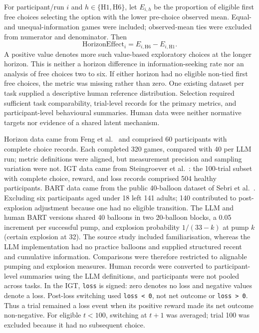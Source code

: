\documentclass[logo,msc]{infthesis}
\begin{document}
For participant/run $i$ and $h\in\{\mathrm{H1},\mathrm{H6}\}$, let $E_{i,h}$ be the proportion of eligible first free choices selecting the option with the lower pre-choice observed mean. Equal- and unequal-information games were included; observed-mean ties were excluded from numerator and denominator. Then
\[
\mathrm{HorizonEffect}_{i}=E_{i,\mathrm{H6}}-E_{i,\mathrm{H1}}.
\]
A positive value denotes more such value-based exploratory choices at the longer horizon. This is neither a horizon difference in information-seeking rate nor an analysis of free choices two to six. If either horizon had no eligible non-tied first free choices, the metric was missing rather than zero.
One existing dataset per task supplied a descriptive human reference distribution. Selection required sufficient task comparability, trial-level records for the primary metrics, and participant-level behavioural summaries. Human data were neither normative targets nor evidence of a shared latent mechanism.

Horizon data came from Feng et al.~\cite{Feng2021ExploreExploit} and comprised 60 participants with complete choice records. Each completed 320 games, compared with 40 per LLM run; metric definitions were aligned, but measurement precision and sampling variation were not. IGT data came from Steingroever et al.~\cite{Steingroever2015IGTData}: the 100-trial subset with complete choice, reward, and loss records comprised 504 healthy participants. BART data came from the public 40-balloon dataset of Sebri et al.~\cite{Sebri2023BART}. Excluding six participants aged under 18 left 141 adults; 140 contributed to post-explosion adjustment because one had no eligible transition. The LLM and human BART versions shared 40 balloons in two 20-balloon blocks, a 0.05 increment per successful pump, and explosion probability $1/(33-k)$ at pump $k$ (certain explosion at 32). The source study included familiarisation, whereas the LLM implementation had no practice balloons and supplied structured recent and cumulative information. Comparisons were therefore restricted to alignable pumping and explosion measures. Human records were converted to participant-level summaries using the LLM definitions, and participants were not pooled across tasks.
In the IGT, \texttt{loss} is signed: zero denotes no loss and negative values denote a loss. Post-loss switching used \texttt{loss < 0}, not net outcome or \texttt{loss > 0}. Thus a trial remained a loss event when its positive reward made its net outcome non-negative. For eligible $t<100$, switching at $t+1$ was averaged; trial 100 was excluded because it had no subsequent choice.
\end{document}
